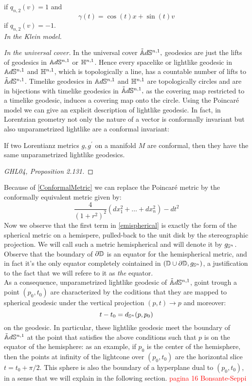 if $q_{n,2}(v)=1$ and 
\[
    \gamma(t)=\cos(t)x+\sin(t)v
\]
if $q_{n,2}(v)=-1$.\\

\textit{In the Klein model.}

\textit{In the universal cover.} In the universal cover $\AS^{n,1},$ geodesics are just the lifts of geodesics in $\A^{n,1}$ or $\H^{n,1}$. Hence every spacelike or lightlike geodesic in $\A^{n,1}$ and $\H^{n,1}$, which is topologically a line, has a countable number of lifts to $\AS^{n,1}$. Timelike geodesics in $\A^{n,1}$ and $\H^{n,1}$ are topologically circles and are in bijections with timelike geodesics in $\AS^{n,1},$ as the covering map restricted to a timelike geodesic, induces a covering map onto the circle. Using the Poincaré model we can give an explicit description of lightlike geodesic. In fact, in Lorentzian geometry not only the nature of a vector is conformally invariant but also unparametrized lightlike are a conformal invariant: 
\begin{theorem}\label{ConformalMetric} If two Lorentianz metrics $g,g^{\prime} $ on a manifold $M$ are conformal, then they have the same unparametrized lightlike geodesics.
\end{theorem}
\begin{proof}
    [GHL04, Proposition 2.131]
\end{proof}
Because of \ref{ConformalMetric} we can replace the Poincaré metric by the conformally equivalent metric given by:
\begin{equation}\label{emispherical}
    \frac{4}{(1+r^2)^2}(dx_1^2+\dots+dx_n^2)-dt^2
\end{equation} 
Now we observe that the first term in \ref{emispherical} is exactly the form of the spherical metric on a hemispere, pulled-back to the unit disk by the stereographic projection. We will call such a metric hemispherical and will denote it by $g_{\S^n}$. Observe that the boundary of $\partial\D$ is an equator for the hemispherical metric, and in fact it's the only equator completely cointained in $(\D\cup\partial\D,g_{\S^n})$, a justification to the fact that we will refere to it as \textit{the} equator.\\
As a consequence, unparametrized lightlike geodesic of $\AS^{n,1}$, goint trough a point $(p_0,t_0)$ are characterized by the coditions that they are mapped to spherical geodesic under the vertical projection $(p,t)\to p$ and moreover: 
\[
    t-t_0=d_{\S^n}(p,p_0)
\] on the geodesic.  In particular, these lightlike geodesic meet the boundary of $\AS^{n,1}$ at the point that satisfies the above conditions such that $p$ is on the equator of the hemisphere: as an example, if $p_0$ is the center of the hemisphere, then the points at infinity of the lightcone over $(p_0,t_0)$ are the horizontal slice $t=t_{0}+\pi/2.$ This sphere is also the boundary of a hyperplane dual to $(p_0,t_0)$, in a sense that we will explain in the following section. 
\textcolor{red}{pagina 16 Bonsante-Seppi}   

